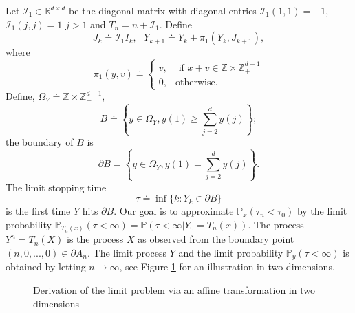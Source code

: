 \documentclass[11pt,a4paper]{article}
\newcommand{\insfig}[3]{
\begin{figure}[h]
\begin{center}
\scalebox{#3}{
\centerline{}}
\end{center}


\vspace{-0.65cm}
\caption{\hspace{0.25cm}#2\label{f:#1}}
\end{figure}
}
\begin{document}
Let ${\mathcal I}_1 \in {\mathbb R}^{d\times d}$ be the diagonal matrix
with diagonal entries ${\mathcal I}_1(1,1) =-1$, ${\mathcal I}_1(j,j) =1$
$j >1$ and $T_n = n + {\mathcal I}_1.$ 
Define
\begin{equation}\label{e:defY}
J_k \doteq {\mathcal I}_1 I_k,~~~ Y_{k+1} \doteq Y_k + \pi_1(Y_k,J_{k+1}),
\end{equation}
where
\[
\pi_1(y,v) \doteq \begin{cases} v, &\text{ if } x +v \in {\mathbb Z} \times {\mathbb Z}_+^{d-1} \\
				  0      , &\text{otherwise.}
\end{cases}
\]
Define, $\Omega_Y \doteq {\mathbb Z} \times {\mathbb Z}_+^{d-1}$,
\begin{equation*}%
B \doteq \left\{ y \in \Omega_Y, y(1) \ge \sum_{j=2}^d y(j) \right\};
\end{equation*}
the boundary of $B$ is 
\begin{equation*}%
\partial B = \left\{ y \in \Omega_Y, y(1) = \sum_{j=2 }^d y(j) \right\}.
\end{equation*}
The limit stopping time
\begin{equation*}%
\tau \doteq \inf \{k: Y_k \in \partial B\}
\end{equation*}
is the first time $Y$ hits $\partial B$.
Our goal is to approximate ${\mathbb P}_x(\tau_n < \tau_0)$
by the limit probability ${\mathbb P}_{T_n(x)}(\tau < \infty) = {\mathbb P}(
\tau < \infty | Y_0 = T_n(x)).$ The process $Y^n =T_n(X)$ is
the process $X$ as observed from the boundary
point $(n,0,...,0) \in \partial A_n.$
The limit process $Y$ and the limit probability ${\mathbb P}_y(\tau < \infty)$
is obtained by letting $n\rightarrow \infty$, see Figure \ref{f:Tn2tex}
for an illustration in two dimensions.

\insfig{Tn2tex}{Derivation of the limit problem via an affine transformation in two dimensions}{0.8}
\end{document}
